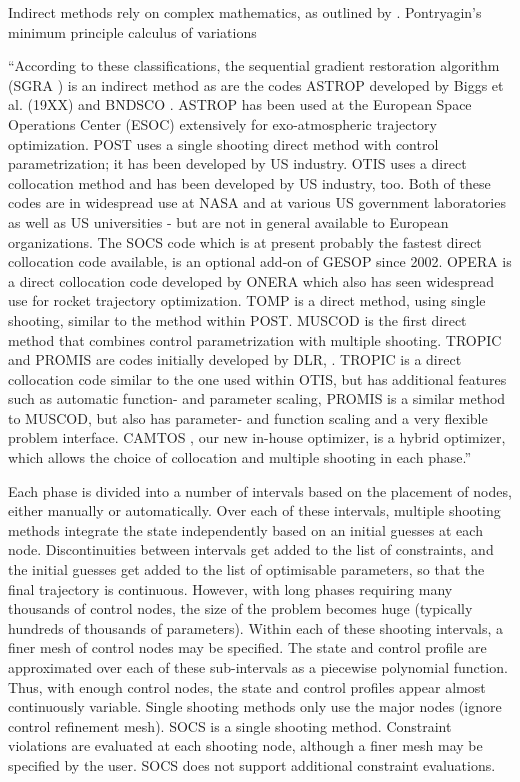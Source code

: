 Indirect methods rely on complex mathematics, as outlined by \textcite{Pontryagin1962}.
Pontryagin's minimum principle
calculus of variations

\enquote{According to these classifications, the sequential gradient restoration algorithm (SGRA \parencite{Miele1975}) is an indirect method as are the codes ASTROP developed by Biggs et al. (19XX) and BNDSCO \parencite{Burlisch1971}. ASTROP has been used at the European Space Operations Center (ESOC) extensively for exo-atmospheric trajectory optimization. POST \parencite{Brauer1987} uses a single shooting direct method with control parametrization; it has been developed by US industry. OTIS \parencite{Hargraves} uses a direct collocation method and has been developed by US industry, too. Both of these codes are in widespread use at NASA and at various US government laboratories as well as US universities - but are not in general available to European organizations. The SOCS code which is at present probably the fastest direct collocation code available, is an optional add-on of GESOP since 2002. OPERA is a direct collocation code developed by ONERA which also has seen widespread use for rocket trajectory optimization. TOMP \parencite{Kraft1980} is a direct method, using single shooting, similar to the method within POST. MUSCOD \parencite{Bock1984} is the first direct method that combines control parametrization with multiple shooting. TROPIC and PROMIS are codes initially developed by DLR, \parencite{Jänsch1990,Schnepper1992}. TROPIC is a direct collocation code similar to the one used within OTIS, but has additional features such as automatic function- and parameter scaling, PROMIS is a similar method to MUSCOD, but also has parameter- and function scaling and a very flexible problem interface. CAMTOS \parencite{Gath2001}, our new in-house optimizer, is a hybrid optimizer, which allows the choice of collocation and multiple shooting in each phase.}\cite{ASTOS_guide}




Each phase is divided into a number of intervals based on the placement of nodes, either manually or automatically.
Over each of these intervals, multiple shooting methods integrate the state independently based on an initial guesses at each node. Discontinuities between intervals get added to the list of constraints, and the initial guesses get added to the list of optimisable parameters, so that the final trajectory is continuous. However, with long phases requiring many thousands of control nodes, the size of the problem becomes huge (typically hundreds of thousands of parameters).
Within each of these shooting intervals, a finer mesh of control nodes may be specified. The state and control profile are approximated over each of these sub-intervals as a piecewise polynomial function. Thus, with enough control nodes, the state and control profiles appear almost continuously variable.
Single shooting methods only use the major nodes (ignore control refinement mesh). SOCS is a single shooting method.
Constraint violations are evaluated at each shooting node, although a finer mesh may be specified by the user. SOCS does not support additional constraint evaluations.

